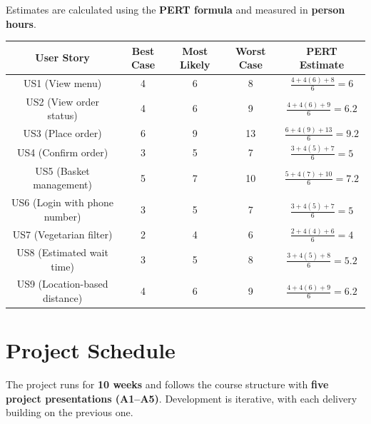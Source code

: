 \documentclass{article}
\begin{document}
Estimates are calculated using the \textbf{PERT formula} and measured in \textbf{person hours}.

\begin{longtable}{|c|c|c|c|c|}
    \hline
    \textbf{User Story} & \textbf{Best Case} & \textbf{Most Likely} & \textbf{Worst Case} & \textbf{PERT Estimate} \\
    \hline
    US1 (View menu) & 4 & 6 & 8 & $\frac{4 + 4(6) + 8}{6} = 6$ \\
    \hline
    US2 (View order status) & 4 & 6 & 9 & $\frac{4 + 4(6) + 9}{6} = 6.2$ \\
    \hline
    US3 (Place order) & 6 & 9 & 13 & $\frac{6 + 4(9) + 13}{6} = 9.2$ \\
    \hline
    US4 (Confirm order) & 3 & 5 & 7 & $\frac{3 + 4(5) + 7}{6} = 5$ \\
    \hline
    US5 (Basket management) & 5 & 7 & 10 & $\frac{5 + 4(7) + 10}{6} = 7.2$ \\
    \hline
    US6 (Login with phone number) & 3 & 5 & 7 & $\frac{3 + 4(5) + 7}{6} = 5$ \\
    \hline
    US7 (Vegetarian filter) & 2 & 4 & 6 & $\frac{2 + 4(4) + 6}{6} = 4$ \\
    \hline
    US8 (Estimated wait time) & 3 & 5 & 8 & $\frac{3 + 4(5) + 8}{6} = 5.2$ \\
    \hline
    US9 (Location-based distance) & 4 & 6 & 9 & $\frac{4 + 4(6) + 9}{6} = 6.2$ \\
    \hline
\end{longtable}

\section{Project Schedule}

The project runs for \textbf{10 weeks} and follows the course structure with
\textbf{five project presentations (A1--A5)}.
Development is iterative, with each delivery building on the previous one.
\end{document}
